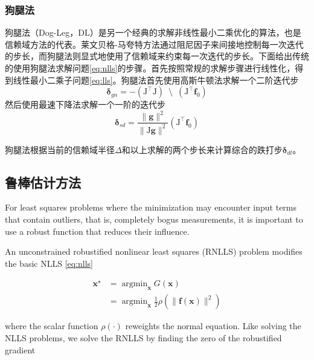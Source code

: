 \subsubsection*{狗腿法}

狗腿法（Dog-Leg，DL）是另一个经典的求解非线性最小二乘优化的算法，也是信赖域方法的代表。莱文贝格-马夸特方法通过阻尼因子来间接地控制每一次迭代的步长，而狗腿法则显式地使用了信赖域来约束每一次迭代的步长。下面给出传统的使用狗腿法求解问题\eqref{eq:nlls}的步骤\cite{tingleff2004methods}。首先按照常规的求解步骤进行线性化，得到线性最小二乘子问题\eqref{eq:lls}。狗腿法首先使用高斯牛顿法求解一个二阶迭代步
\begin{equation}
    \bm{\delta}_{gn} =
        -\left( \mathrm{J}^\top\mathrm{J} \right)
        \enspace\setminus\enspace
        \left( \mathrm{J}^\top \mathbf{f}_0 \right)
\end{equation}
然后使用最速下降法求解一个一阶的迭代步
\begin{equation}
    \bm{\delta}_{sd} =
        \frac{\lVert\bm{g}\rVert^2}{\lVert\mathrm{J}\bm{g}\rVert^2}
        \left( \mathrm{J}^\top \mathbf{f}_0 \right)
\end{equation}

狗腿法根据当前的信赖域半径$\Delta$和以上求解的两个步长来计算综合的跌打步$\bm{\delta}_{dl}$。

\subsection{鲁棒估计方法}

For least squares problems where the minimization may encounter input terms that contain outliers, that is, completely bogus measurements, it is important to use a robust function that reduces their influence\citep{ceres-solver}.

An unconstrained robustified nonlinear least squares (RNLLS) problem modifies the basic NLLS \eqref{eq:nlls}

\begin{equation}\label{eq:rnlls}
\begin{aligned}
    \bm{x}^\star &= \mathop{\arg\min}_{\bm{x}} G(\bm{x}) \\
                 &= \mathop{\arg\min}_{\bm{x}}
                    \frac{1}{2} \rho
                    \left( \lVert \mathbf{f}(\bm{x}) \rVert^2 \right)
\end{aligned}
\end{equation}

where the scalar function $\rho(\cdot)$ reweights the normal equation. Like solving the NLLS problems, we solve the RNLLS by finding the zero of the robustified gradient

